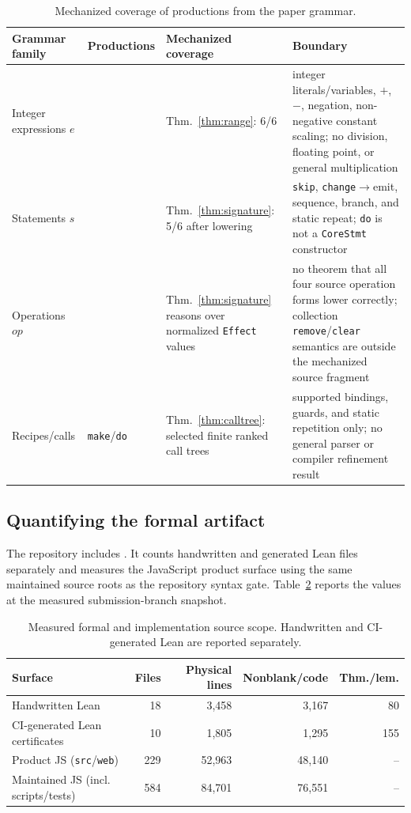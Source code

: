 \documentclass[10pt]{article}
\theoremstyle{plain}
\theoremstyle{remark}
\begin{document}
\begin{table}[H]
\centering
\caption{Mechanized coverage of productions from the paper grammar.}
\label{tab:grammar-coverage}
\small
\begin{tabular}{@{}>{\raggedright\arraybackslash}p{30mm}>{\raggedright\arraybackslash}p{18mm}>{\raggedright\arraybackslash}p{44mm}>{\raggedright\arraybackslash}p{50mm}@{}}
\toprule
Grammar family & Productions & Mechanized coverage & Boundary \\
\midrule
Integer expressions $e$ & 6 & Thm.~\ref{thm:range}: 6/6 & integer literals/variables, $+$, $-$, negation, non-negative constant scaling; no division, floating point, or general multiplication \\
Statements $s$ & 6 & Thm.~\ref{thm:signature}: 5/6 after lowering & \texttt{skip}, \texttt{change}$\rightarrow$emit, sequence, branch, and static repeat; \texttt{do} is not a \texttt{CoreStmt} constructor \\
Operations $op$ & 4 & Thm.~\ref{thm:signature} reasons over normalized \texttt{Effect} values & no theorem that all four source operation forms lower correctly; collection \texttt{remove}/\texttt{clear} semantics are outside the mechanized source fragment \\
Recipes/calls & \texttt{make}/\texttt{do} & Thm.~\ref{thm:calltree}: selected finite ranked call trees & supported bindings, guards, and static repetition only; no general parser or compiler refinement result \\
\bottomrule
\end{tabular}
\end{table}

\subsection{Quantifying the formal artifact}
The repository includes . It counts handwritten and generated Lean files separately and measures the JavaScript product surface using the same maintained source roots as the repository syntax gate. Table~\ref{tab:formal-scope} reports the values at the measured submission-branch snapshot.

\begin{table}[H]
\centering
\caption{Measured formal and implementation source scope. Handwritten and CI-generated Lean are reported separately.}
\label{tab:formal-scope}
\small
\begin{tabular}{@{}lrrrr@{}}
\toprule
Surface & Files & Physical lines & Nonblank/code & Thm./lem. \\
\midrule
Handwritten Lean & 18 & 3,458 & 3,167 & 80 \\
CI-generated Lean certificates & 10 & 1,805 & 1,295 & 155 \\
Product JS (\texttt{src}/\texttt{web}) & 229 & 52,963 & 48,140 & -- \\
Maintained JS (incl. scripts/tests) & 584 & 84,701 & 76,551 & -- \\
\bottomrule
\end{tabular}
\end{table}
\end{document}
